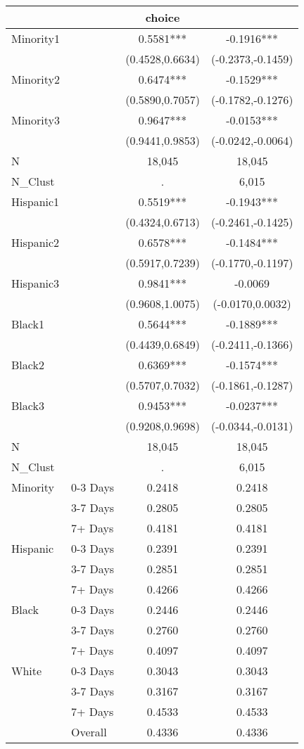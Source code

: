 \begin{tabular}{llcc}
\hline  &  & choice & \\
\hline Minority1 &  & 0.5581*** & -0.1916***\\
 &  & (0.4528,0.6634) & (-0.2373,-0.1459)\\
Minority2 &  & 0.6474*** & -0.1529***\\
 &  & (0.5890,0.7057) & (-0.1782,-0.1276)\\
Minority3 &  & 0.9647*** & -0.0153***\\
 &  & (0.9441,0.9853) & (-0.0242,-0.0064)\\
N &  & 18,045 & 18,045\\
N\_Clust &  & . & 6,015\\
Hispanic1 &  & 0.5519*** & -0.1943***\\
 &  & (0.4324,0.6713) & (-0.2461,-0.1425)\\
Hispanic2 &  & 0.6578*** & -0.1484***\\
 &  & (0.5917,0.7239) & (-0.1770,-0.1197)\\
Hispanic3 &  & 0.9841*** & -0.0069\\
 &  & (0.9608,1.0075) & (-0.0170,0.0032)\\
Black1 &  & 0.5644*** & -0.1889***\\
 &  & (0.4439,0.6849) & (-0.2411,-0.1366)\\
Black2 &  & 0.6369*** & -0.1574***\\
 &  & (0.5707,0.7032) & (-0.1861,-0.1287)\\
Black3 &  & 0.9453*** & -0.0237***\\
 &  & (0.9208,0.9698) & (-0.0344,-0.0131)\\
N &  & 18,045 & 18,045\\
N\_Clust &  & . & 6,015\\
Minority & 0-3 Days & 0.2418 & 0.2418\\
 & 3-7 Days & 0.2805 & 0.2805\\
 & 7+ Days & 0.4181 & 0.4181\\
Hispanic & 0-3 Days & 0.2391 & 0.2391\\
 & 3-7 Days & 0.2851 & 0.2851\\
 & 7+ Days & 0.4266 & 0.4266\\
Black & 0-3 Days & 0.2446 & 0.2446\\
 & 3-7 Days & 0.2760 & 0.2760\\
 & 7+ Days & 0.4097 & 0.4097\\
White & 0-3 Days & 0.3043 & 0.3043\\
 & 3-7 Days & 0.3167 & 0.3167\\
 & 7+ Days & 0.4533 & 0.4533\\
 & Overall & 0.4336 & 0.4336\\
\hline\end{tabular}\\
\hfil\\
